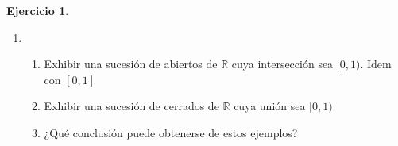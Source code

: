 \documentclass[12pt]{article}
\newcommand{\R}{\mathbb{R}}
\newcommand{\N}{\mathbb{N}}
\theoremstyle{definition}
\newtheorem{ej}{Ejercicio}
\begin{document}
\begin{ej}
\begin{enumerate}
\begin{proof}
  Veamosló. $x \in F$ entonces $x \in B(x,\frac{1}{n})\quad \forall n \in \N$ entonces $x \in U_n \quad \forall n \in \N$

Entonces $y \in \bigcap U_n$

Sea $y \in \bigcap U_n$ entonces $y \in U_n \quad \forall n \in \N$ entonces para cada $n \in \N$ sabemos que $y $ pertenece a alguna de esas bolas, otra forma de decirlo $y \in B(x_n,\frac{1}{n})$ para algún $x_n \in F$ pero entonces dado un $\epsilon > 0$ sabemos que existe un $n_0 \in \N$ tal que $\frac{1}{n_0} \leq \epsilon$ pero ademas sabemos que para todo $n > n_0 $ sucede $\frac{1}{n} \leq \frac{1}{n_0} \leq \epsilon $ por ende $d(x_n , y) \leq \epsilon \quad \forall n \geq n_0$

Pero entonces $x_n$ converge a $y$ y además $x_n \in F \quad \forall n \in \N$ y como $F$ es cerrado tenemos que $y \in F$

Forma B. Sea $G$ abierto
$$U_n = \bigcup_{x \in X \setminus G}B(x,\frac{1}{n}) $$

Luego tenemos $F_n = X \setminus U_n$ que es complemento de abierto por lo tanto cerrado.

Ahora afirmo que $G = \bigcup F_n$ que es unión de cerrados por lo tanto $F_{\sigma}$

Veamosló, sea $y \in G$ supongamos $y \notin \bigcup F_n $ entonces $y \notin F_n \quad \forall n \in \N$

Entonces $y \in U_n \quad \forall n \in \N$ por lo tanto $y \in \bigcap U_n$ por el mismo argumento que antes esto implica que $y \in X \setminus G $ , lo que es absurdo. Luego $y \in \bigcup F_n$

Sea $y \in \bigcup F_n$ entonces $y \in F_n \quad \forall n \in \N$ entonces $y \notin U_n \quad \forall n \in \N$ 

Supongamos $y \notin G$ entonces $y \in X \setminus G$ pero entonces $y \in U_n$ para algún $n \in \N$ seguro

Lo que es absurdo , entonces $y \in G$
\newpage
\end{proof}
  \item 
    \begin{enumerate}
      \item Exhibir una sucesión de abiertos de $\R$ cuya intersección sea $[0,1)$. Idem con $[0,1]$
      \item Exhibir una sucesión de cerrados de $\R$ cuya unión sea $[0,1)$
      \item ¿Qué conclusión puede obtenerse de estos ejemplos? 
    \end{enumerate}
\end{enumerate}
\end{ej}
\end{document}

